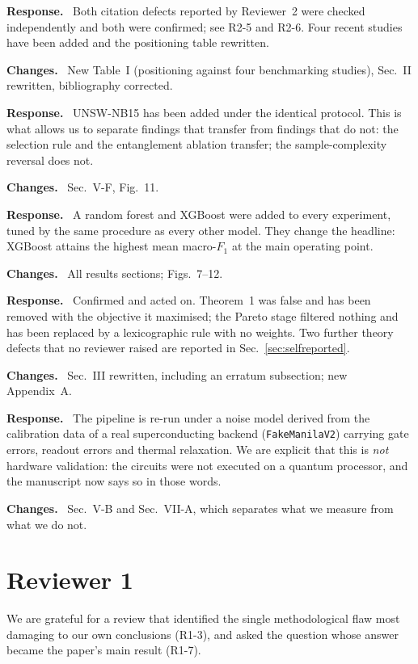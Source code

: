 \documentclass[11pt,a4paper]{article}
\newcommand{\itemhead}[2]{%
  \par\addvspace{15pt}%
  \noindent{\bfseries\color{tagink}#1}\hspace{0.7em}{\bfseries #2}%
  \par\addvspace{3.5pt}%
  \noindent{\color{rulegray}\rule{\linewidth}{0.5pt}}%
  \par\addvspace{5pt}%
  \nobreak}
\newcommand{\resp}{\par\addvspace{2pt}\noindent\textbf{Response.}\ }
\newcommand{\changed}{\par\addvspace{5pt}\noindent
  {\bfseries\color{tagink}Changes.}\ }
\begin{document}
\itemhead{AE-2}{Insufficient literature coverage, including non-existent
references}
\resp
Both citation defects reported by Reviewer~2 were checked independently and both
were confirmed; see R2-5 and R2-6. Four recent studies have been added and the
positioning table rewritten.
\changed
New Table~I (positioning against four benchmarking studies), Sec.~II rewritten,
bibliography corrected.

\itemhead{AE-3}{Reviewer~1 requests validation on an additional dataset}
\resp
UNSW-NB15 has been added under the identical protocol. This is what allows us to
separate findings that transfer from findings that do not: the selection rule
and the entanglement ablation transfer; the sample-complexity reversal does not.
\changed
Sec.~V-F, Fig.~11.

\itemhead{AE-4}{Comparison with non-SVM methods as a prerequisite for practical
advantage claims}
\resp
A random forest and XGBoost were added to every experiment, tuned by the same
procedure as every other model. They change the headline: XGBoost attains the
highest mean macro-$F_1$ at the main operating point.
\changed
All results sections; Figs.~7--12.

\itemhead{AE-5}{Reviewer~4 identified issues in the theory}
\resp
Confirmed and acted on. Theorem~1 was false and has been removed with the
objective it maximised; the Pareto stage filtered nothing and has been replaced
by a lexicographic rule with no weights. Two further theory defects that no
reviewer raised are reported in Sec.~\ref{sec:selfreported}.
\changed
Sec.~III rewritten, including an erratum subsection; new Appendix~A.

\itemhead{AE-6}{``NISQ-ready'' not supported by experiments or noisy
simulations}
\resp
The pipeline is re-run under a noise model derived from the calibration data of
a real superconducting backend (\texttt{FakeManilaV2}) carrying gate errors,
readout errors and thermal relaxation. We are explicit that this is
\emph{not} hardware validation: the circuits were not executed on a quantum
processor, and the manuscript now says so in those words.
\changed
Sec.~V-B and Sec.~VII-A, which separates what we measure from what we do not.

\section{Reviewer 1}

We are grateful for a review that identified the single methodological flaw
most damaging to our own conclusions (R1-3), and asked the question whose answer
became the paper's main result (R1-7).
\end{document}
